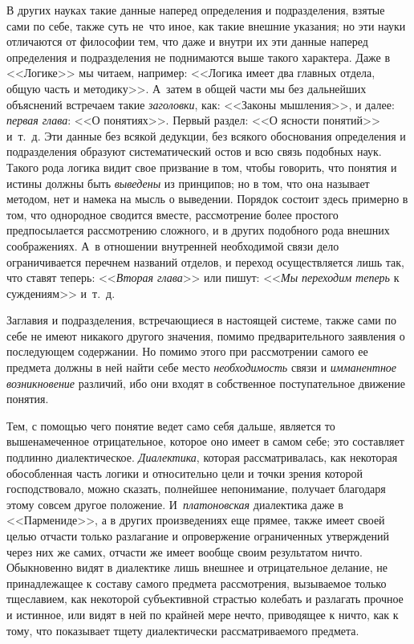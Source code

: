 В других науках такие данные наперед определения и подразделения, взятые
сами по себе, также суть не~что иное, как такие внешние указания; но эти
науки отличаются от философии тем, что даже и внутри их эти данные наперед
определения и подразделения не поднимаются выше такого характера. Даже в
<<Логике>> мы читаем, например: <<Логика имеет два главных отдела, общую часть
и методику>>. А~затем в общей части мы без дальнейших объяснений встречаем
такие {\em заголовки}, как: <<Законы мышления>>, и далее:
{\em первая глава}: <<О понятиях>>. Первый раздел: <<О
ясности понятий>> и~т.~д. Эти данные без всякой дедукции, без всякого
обоснования определения и подразделения образуют систематический остов и
всю связь подобных наук. Такого рода логика видит свое призвание в том,
чтобы говорить, что понятия и истины должны быть
{\em выведены} из принципов; но в том, что она называет
методом, нет и намека на мысль о выведении. Порядок состоит здесь примерно
в том, что однородное сводится вместе, рассмотрение более простого
предпосылается рассмотрению сложного, и в других подобного рода внешних
соображениях. А~в отношении внутренней необходимой связи дело
ограничивается перечнем названий отделов, и переход осуществляется лишь
так, что ставят теперь: <<{\em Вторая глава}>> или пишут:
<<{\em Мы переходим теперь} к суждениям>> и~т.~д.

Заглавия и подразделения, встречающиеся в настоящей системе, также сами по
себе не имеют никакого другого значения, помимо предварительного заявления
о последующем содержании. Но помимо этого при рассмотрении самого ее
предмета должны в ней найти себе место {\em необходимость} связи и
{\em имманентное возникновение} различий, ибо они
входят в собственное поступательное движение понятия.

Тем, с помощью чего понятие ведет само себя дальше, является то
вышенамеченное отрицательное, которое оно имеет в самом себе; это
составляет подлинно диалектическое. {\em Диалектика},
которая рассматривалась, как некоторая обособленная часть логики и
относительно цели и точки зрения которой господствовало, можно сказать,
полнейшее непонимание, получает благодаря этому совсем другое положение.
И~{\em платоновская} диалектика даже в <<Пармениде>>, а в
других произведениях еще прямее, также имеет своей целью отчасти только
разлагание и опровержение ограниченных утверждений через них же самих,
отчасти же имеет вообще своим результатом ничто. Обыкновенно видят в
диалектике лишь внешнее и отрицательное делание, не принадлежащее к составу
самого предмета рассмотрения, вызываемое только тщеславием, как некоторой
субъективной страстью колебать и разлагать прочное и истинное, или видят в
ней по крайней мере нечто, приводящее к ничто, как к тому, что показывает
тщету диалектически рассматриваемого предмета.

